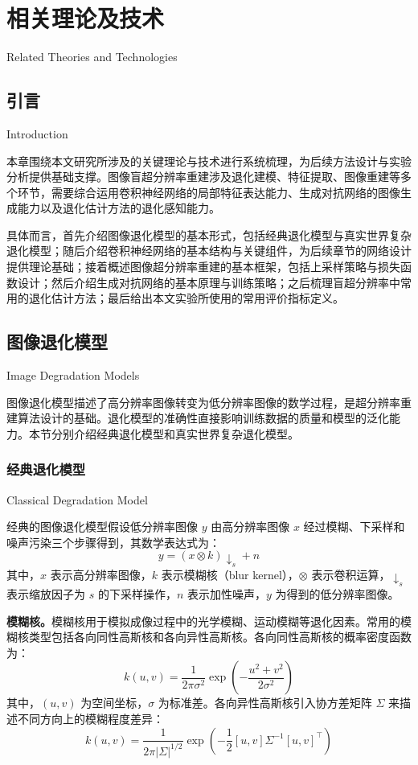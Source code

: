 \chapter{相关理论及技术}{Related Theories and Technologies}
\label{chap:related}

\section{引言}{Introduction}

本章围绕本文研究所涉及的关键理论与技术进行系统梳理，为后续方法设计与实验分析提供基础支撑。图像盲超分辨率重建涉及退化建模、特征提取、图像重建等多个环节，需要综合运用卷积神经网络的局部特征表达能力、生成对抗网络的图像生成能力以及退化估计方法的退化感知能力。

具体而言，首先介绍图像退化模型的基本形式，包括经典退化模型与真实世界复杂退化模型；随后介绍卷积神经网络的基本结构与关键组件，为后续章节的网络设计提供理论基础；接着概述图像超分辨率重建的基本框架，包括上采样策略与损失函数设计；然后介绍生成对抗网络的基本原理与训练策略；之后梳理盲超分辨率中常用的退化估计方法；最后给出本文实验所使用的常用评价指标定义。

\section{图像退化模型}{Image Degradation Models}

图像退化模型描述了高分辨率图像转变为低分辨率图像的数学过程，是超分辨率重建算法设计的基础。退化模型的准确性直接影响训练数据的质量和模型的泛化能力。本节分别介绍经典退化模型和真实世界复杂退化模型。

\subsection{经典退化模型}{Classical Degradation Model}

经典的图像退化模型假设低分辨率图像 $y$ 由高分辨率图像 $x$ 经过模糊、下采样和噪声污染三个步骤得到，其数学表达式为：
\begin{equation}
  y = (x \otimes k)\!\downarrow_s + n
  \label{eq:classical_degradation}
\end{equation}
其中，$x$ 表示高分辨率图像，$k$ 表示模糊核（blur kernel），$\otimes$ 表示卷积运算，$\downarrow_s$ 表示缩放因子为 $s$ 的下采样操作，$n$ 表示加性噪声，$y$ 为得到的低分辨率图像。

\textbf{模糊核。}模糊核用于模拟成像过程中的光学模糊、运动模糊等退化因素。常用的模糊核类型包括各向同性高斯核和各向异性高斯核。各向同性高斯核的概率密度函数为：
\begin{equation}
  k(u,v) = \frac{1}{2\pi\sigma^2}\exp\left(-\frac{u^2+v^2}{2\sigma^2}\right)
  \label{eq:isotropic_gaussian}
\end{equation}
其中，$(u,v)$ 为空间坐标，$\sigma$ 为标准差。各向异性高斯核引入协方差矩阵 $\Sigma$ 来描述不同方向上的模糊程度差异：
\begin{equation}
  k(u,v) = \frac{1}{2\pi|\Sigma|^{1/2}}\exp\left(-\frac{1}{2}[u,v]\Sigma^{-1}[u,v]^{\top}\right)
  \label{eq:anisotropic_gaussian}
\end{equation}

